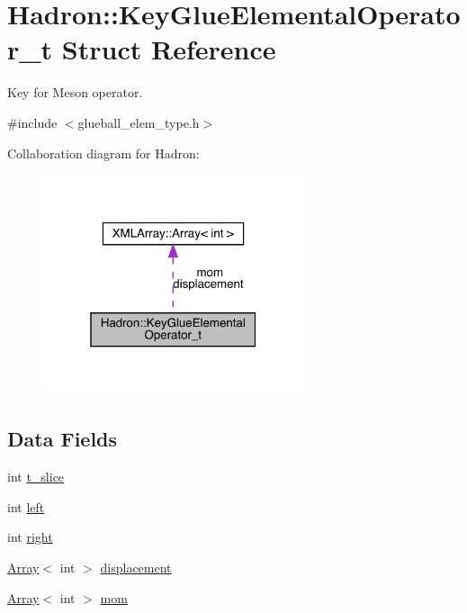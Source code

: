\hypertarget{structHadron_1_1KeyGlueElementalOperator__t}{}\section{Hadron\+:\+:Key\+Glue\+Elemental\+Operator\+\_\+t Struct Reference}
\label{structHadron_1_1KeyGlueElementalOperator__t}


Key for Meson operator.  




{\ttfamily \#include $<$glueball\+\_\+elem\+\_\+type.\+h$>$}



Collaboration diagram for Hadron\+:\nopagebreak
\begin{figure}[H]
\begin{center}
\leavevmode
\includegraphics[width=217pt]{d1/df7/structHadron_1_1KeyGlueElementalOperator__t__coll__graph}
\end{center}
\end{figure}
\subsection*{Data Fields}
\begin{DoxyCompactItemize}
\item 
int \mbox{\hyperlink{structHadron_1_1KeyGlueElementalOperator__t_a678f4b074f03c2acbedf72f3458fbbb6}{t\+\_\+slice}}
\item 
int \mbox{\hyperlink{structHadron_1_1KeyGlueElementalOperator__t_a8644909a558d258728465b7cd3f4aa44}{left}}
\item 
int \mbox{\hyperlink{structHadron_1_1KeyGlueElementalOperator__t_a81292d0ee6bd97ac66b0f100c94b1010}{right}}
\item 
\mbox{\hyperlink{classXMLArray_1_1Array}{Array}}$<$ int $>$ \mbox{\hyperlink{structHadron_1_1KeyGlueElementalOperator__t_a8809dca6672646b227b5a2f7160d0d07}{displacement}}
\item 
\mbox{\hyperlink{classXMLArray_1_1Array}{Array}}$<$ int $>$ \mbox{\hyperlink{structHadron_1_1KeyGlueElementalOperator__t_acc0e7e9420491261bf7c7199ae522664}{mom}}
\end{DoxyCompactItemize}


